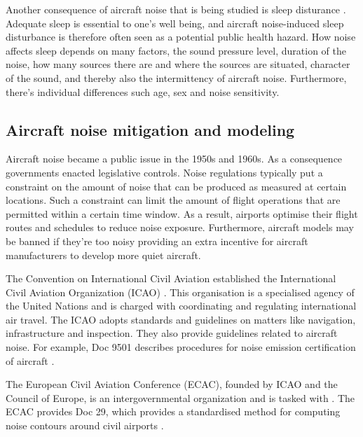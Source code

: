 Another consequence of aircraft noise that is being studied is sleep disturance
\cite{Michaud2007}. Adequate sleep is essential to one's well being, and
aircraft noise-induced sleep disturbance is therefore often seen as a potential
public health hazard.
How noise affects sleep depends on many factors, the sound pressure level,
duration of the noise, how many sources there are and where the sources are situated,
character of the sound, and thereby also the intermittency of aircraft noise.
Furthermore, there's individual differences such age, sex and noise sensitivity.


\subsection{Aircraft noise mitigation and modeling}
Aircraft noise became a public issue in the 1950s and 1960s. As a consequence
governments enacted legislative controls. Noise regulations typically put a constraint on
the amount of noise that can be produced as measured at certain locations. Such
a constraint can limit the amount of flight operations that are permitted within
a certain time window. As a result, airports optimise their flight routes and
schedules to reduce noise exposure. Furthermore, aircraft models may be banned
if they're too noisy providing an extra incentive for aircraft manufacturers to
develop more quiet aircraft.


The Convention on International Civil Aviation established the International
Civil Aviation Organization (ICAO) \cite{ICAO2017}. This organisation is a
specialised agency of the United Nations and is charged with coordinating and
regulating international air travel. The ICAO adopts standards and guidelines on
matters like navigation, infrastructure and inspection. They also provide
guidelines related to aircraft noise. For example, Doc 9501 describes procedures
for noise emission certification of aircraft \cite{ICAO_9601}.

The European Civil Aviation Conference (ECAC), founded by ICAO and the Council
of Europe, is an intergovernmental organization and is tasked with  \cite{ECAC2017}. The ECAC provides Doc 29, which
provides a standardised method for computing noise contours around civil
airports \cite{Doc29_fourth_2016}.

